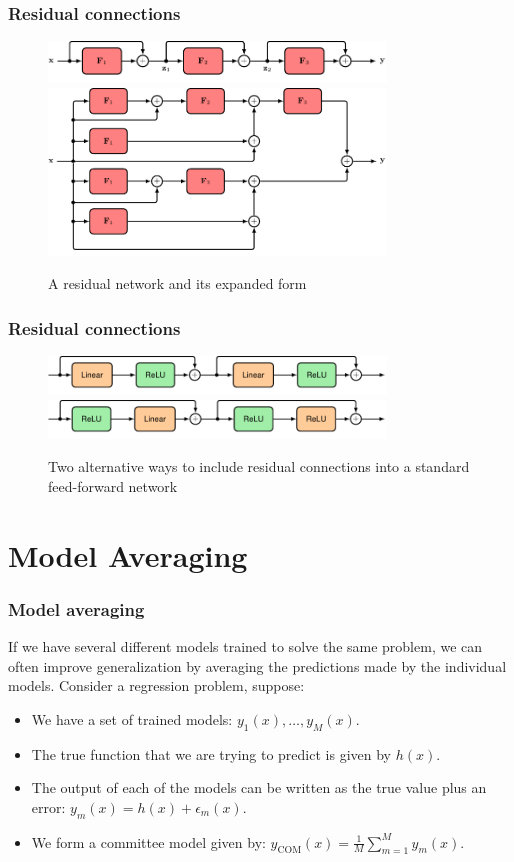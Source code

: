 \documentclass{beamer}
\begin{document}
\begin{frame}
    \frametitle{Residual connections}
    \begin{figure}
        \caption{A residual network and its expanded form}
        \includegraphics[width=0.8\textwidth]{Figure_13.pdf}
        \includegraphics[width=0.8\textwidth]{Figure_15.pdf}
    \end{figure}
\end{frame}

\begin{frame}
    \frametitle{Residual connections}
    \begin{figure}
        \caption{Two alternative ways to include residual connections into a standard feed-forward network}
        \includegraphics[width=0.8\textwidth]{Figure_16_a.pdf}
        \includegraphics[width=0.8\textwidth]{Figure_16_b.pdf}
    \end{figure}
\end{frame}

\section{Model Averaging}

\begin{frame}
    \frametitle{Model averaging}
    If we have several different models trained to solve the same problem, we can often improve generalization by averaging the predictions made by the individual models. Consider a regression problem, suppose:
    \begin{itemize}
        \item We have a set of trained models: $y_{1}(x),\hdots,y_{M}(x)$.
        \item The true function that we are trying to predict is given by $h(x)$.
        \item The output of each of the models can be written as the true value plus an error: $y_{m}(x)=h(x)+\epsilon_{m}(x)$.
        \item We form a committee model given by: $y_{\textrm{COM}}(x)=\frac{1}{M}\sum_{m=1}^{M}y_{m}(x)$.
    \end{itemize}
\end{frame}
\end{document}
